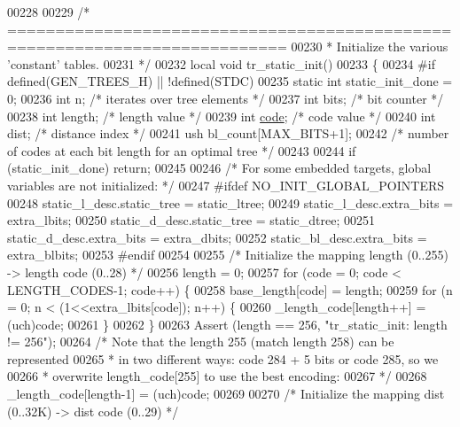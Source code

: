 \begin{DoxyCode}
{{00228 
00229 \textcolor{comment}{/* ===========================================================================}
00230 \textcolor{comment}{ * Initialize the various 'constant' tables.}
00231 \textcolor{comment}{ */}
00232 local \textcolor{keywordtype}{void} tr\_static\_init()
00233 \{
00234 \textcolor{preprocessor}{#if defined(GEN\_TREES\_H) || !defined(STDC)}
00235     \textcolor{keyword}{static} \textcolor{keywordtype}{int} static\_init\_done = 0;
00236     \textcolor{keywordtype}{int} n;        \textcolor{comment}{/* iterates over tree elements */}
00237     \textcolor{keywordtype}{int} bits;     \textcolor{comment}{/* bit counter */}
00238     \textcolor{keywordtype}{int} length;   \textcolor{comment}{/* length value */}
00239     \textcolor{keywordtype}{int} \hyperlink{structcode}{code};     \textcolor{comment}{/* code value */}
00240     \textcolor{keywordtype}{int} dist;     \textcolor{comment}{/* distance index */}
00241     ush bl\_count[MAX\_BITS+1];
00242     \textcolor{comment}{/* number of codes at each bit length for an optimal tree */}
00243 
00244     \textcolor{keywordflow}{if} (static\_init\_done) \textcolor{keywordflow}{return};
00245 
00246     \textcolor{comment}{/* For some embedded targets, global variables are not initialized: */}
00247 \textcolor{preprocessor}{#ifdef NO\_INIT\_GLOBAL\_POINTERS}
00248     static\_l\_desc.static\_tree = static\_ltree;
00249     static\_l\_desc.extra\_bits = extra\_lbits;
00250     static\_d\_desc.static\_tree = static\_dtree;
00251     static\_d\_desc.extra\_bits = extra\_dbits;
00252     static\_bl\_desc.extra\_bits = extra\_blbits;
00253 \textcolor{preprocessor}{#endif}
00254 
00255     \textcolor{comment}{/* Initialize the mapping length (0..255) -> length code (0..28) */}
00256     length = 0;
00257     \textcolor{keywordflow}{for} (code = 0; code < LENGTH\_CODES-1; code++) \{
00258         base\_length[code] = length;
00259         \textcolor{keywordflow}{for} (n = 0; n < (1<<extra\_lbits[code]); n++) \{
00260             \_length\_code[length++] = (uch)code;
00261         \}
00262     \}
00263     Assert (length == 256, \textcolor{stringliteral}{"tr\_static\_init: length != 256"});
00264     \textcolor{comment}{/* Note that the length 255 (match length 258) can be represented}
00265 \textcolor{comment}{     * in two different ways: code 284 + 5 bits or code 285, so we}
00266 \textcolor{comment}{     * overwrite length\_code[255] to use the best encoding:}
00267 \textcolor{comment}{     */}
00268     \_length\_code[length-1] = (uch)code;
00269 
00270     \textcolor{comment}{/* Initialize the mapping dist (0..32K) -> dist code (0..29) */}
}}
\end{DoxyCode}
